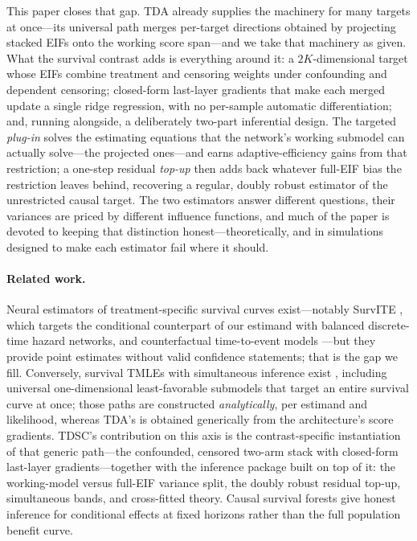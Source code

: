 \documentclass[11pt]{article}
\theoremstyle{remark}
\begin{document}
This paper closes that gap. TDA already supplies the machinery for many targets at once---its universal path merges per-target directions obtained by projecting stacked EIFs onto the working score span---and we take that machinery as given. What the survival contrast adds is everything around it: a $2K$-dimensional target whose EIFs combine treatment and censoring weights under confounding and dependent censoring; closed-form last-layer gradients that make each merged update a single ridge regression, with no per-sample automatic differentiation; and, running alongside, a deliberately two-part inferential design. The targeted \emph{plug-in} solves the estimating equations that the network's working submodel can actually solve---the projected ones---and earns adaptive-efficiency gains from that restriction; a one-step residual \emph{top-up} then adds back whatever full-EIF bias the restriction leaves behind, recovering a regular, doubly robust estimator of the unrestricted causal target. The two estimators answer different questions, their variances are priced by different influence functions, and much of the paper is devoted to keeping that distinction honest---theoretically, and in simulations designed to make each estimator fail where it should.

\paragraph{Related work.} Neural estimators of treatment-specific survival curves exist---notably SurvITE \citep{curth2021survite}, which targets the conditional counterpart of our estimand with balanced discrete-time hazard networks, and counterfactual time-to-event models \citep{chapfuwa2021}---but they provide point estimates without valid confidence statements; that is the gap we fill. Conversely, survival TMLEs with simultaneous inference exist \citep{vdlgruber2016,cai2020,rytgaard2024}, including universal one-dimensional least-favorable submodels that target an entire survival curve at once; those paths are constructed \emph{analytically}, per estimand and likelihood, whereas TDA's is obtained generically from the architecture's score gradients. TDSC's contribution on this axis is the contrast-specific instantiation of that generic path---the confounded, censored two-arm stack with closed-form last-layer gradients---together with the inference package built on top of it: the working-model versus full-EIF variance split, the doubly robust residual top-up, simultaneous bands, and cross-fitted theory. Causal survival forests \citep{cui2023csf} give honest inference for conditional effects at fixed horizons rather than the full population benefit curve.
\end{document}
